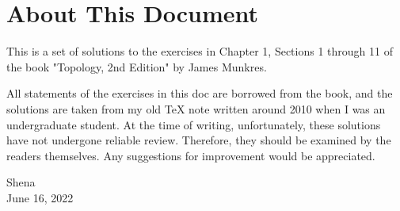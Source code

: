 \documentclass[a4paper,12pt]{article}
\begin{document}
\section*{About This Document}
This is a set of solutions to the exercises in Chapter 1, Sections 1 through 11 of the book "Topology, 2nd Edition" by James Munkres.

All statements of the exercises in this doc are borrowed from the book, and the solutions are taken from my old TeX note written around 2010 when I was an undergraduate student. At the time of writing, unfortunately, these solutions have not undergone reliable review. Therefore, they should be examined by the readers themselves. Any suggestions for improvement would be appreciated.

\begin{flushright}
	Shena\\
	June 16, 2022
\end{flushright}
\end{document}
